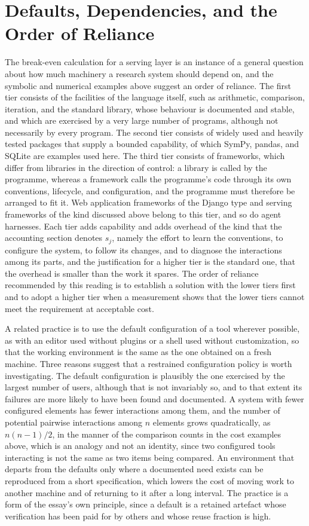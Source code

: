 \documentclass[11pt]{article}
\theoremstyle{remark}
\begin{document}
\section{Defaults, Dependencies, and the Order of Reliance}\label{sec:defaults}

The break-even calculation for a serving layer is an instance of a general question about how much machinery a research system should depend on, and the symbolic and numerical examples above suggest an order of reliance. The first tier consists of the facilities of the language itself, such as arithmetic, comparison, iteration, and the standard library, whose behaviour is documented and stable, and which are exercised by a very large number of programs, although not necessarily by every program. The second tier consists of widely used and heavily tested packages that supply a bounded capability, of which SymPy, pandas, and SQLite are examples used here. The third tier consists of frameworks, which differ from libraries in the direction of control: a library is called by the programme, whereas a framework calls the programme's code through its own conventions, lifecycle, and configuration, and the programme must therefore be arranged to fit it. Web application frameworks of the Django type and serving frameworks of the kind discussed above belong to this tier, and so do agent harnesses. Each tier adds capability and adds overhead of the kind that the accounting section denotes $s_j$, namely the effort to learn the conventions, to configure the system, to follow its changes, and to diagnose the interactions among its parts, and the justification for a higher tier is the standard one, that the overhead is smaller than the work it spares. The order of reliance recommended by this reading is to establish a solution with the lower tiers first and to adopt a higher tier when a measurement shows that the lower tiers cannot meet the requirement at acceptable cost.

A related practice is to use the default configuration of a tool wherever possible, as with an editor used without plugins or a shell used without customization, so that the working environment is the same as the one obtained on a fresh machine. Three reasons suggest that a restrained configuration policy is worth investigating. The default configuration is plausibly the one exercised by the largest number of users, although that is not invariably so, and to that extent its failures are more likely to have been found and documented. A system with fewer configured elements has fewer interactions among them, and the number of potential pairwise interactions among $n$ elements grows quadratically, as $n(n-1)/2$, in the manner of the comparison counts in the cost examples above, which is an analogy and not an identity, since two configured tools interacting is not the same as two items being compared. An environment that departs from the defaults only where a documented need exists can be reproduced from a short specification, which lowers the cost of moving work to another machine and of returning to it after a long interval. The practice is a form of the essay's own principle, since a default is a retained artefact whose verification has been paid for by others and whose reuse fraction is high.
\end{document}
